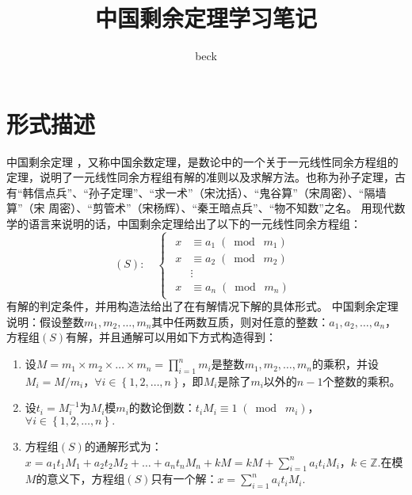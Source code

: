 \documentclass[UTF8]{ctexart}
\title{中国剩余定理学习笔记}
\author{beck}
\begin{document}
\maketitle
\vfill
\section*{形式描述}
中国剩余定理 \cite{中国剩余定理}，又称中国余数定理，是数论中的一个关于一元线性同余方程组的定理，说明了一元线性同余方程组有解的准则以及求解方法。也称为孙子定理，古有“韩信点兵”、“孙子定理”、“求一术”（宋沈括）、“鬼谷算”（宋周密）、“隔墙算”（宋 周密）、“剪管术”（宋杨辉）、“秦王暗点兵”、“物不知数”之名。
用现代数学的语言来说明的话，中国剩余定理给出了以下的一元线性同余方程组：
\[
    (S):\quad
    \begin{cases}
        \begin{aligned}
            x & \equiv a_1 \;(\bmod\;m_1) \\
            x & \equiv a_2 \;(\bmod\;m_2) \\
              & \vdots                    \\
            x & \equiv a_n \;(\bmod\;m_n)
        \end{aligned}
    \end{cases}
\]
有解的判定条件，并用构造法给出了在有解情况下解的具体形式。
中国剩余定理说明：假设整数$m_1,m_2,\ldots,m_n$其中任两数互质，则对任意的整数：$a_1,a_2,\ldots,a_n$，方程组$(S)$有解，并且通解可以用如下方式构造得到：
\begin{enumerate}[1.]
    \item 设$M = m_1 \times m_2 \times \ldots \times m_n = {\displaystyle \prod_{i=1}^n m_i}$是整数$m_1,m_2,\ldots,m_n$的乘积，并设$M_i=M/m_i$，$\forall i \in \left\{1,2,\ldots,n\right\}$，即$M_i$是除了$m_i$以外的$n - 1$个整数的乘积。
    \item 设$t_i = M_i^{-1}$为$M_i$模$m_i$的数论倒数：$t_iM_i \equiv 1\;(\bmod\;m_i)$，$\forall i \in \left\{1,2,\ldots,n\right\}.$
    \item 方程组$(S)$的通解形式为：$x = a_1t_1M_1 + a_2t_2M_2 + \ldots + a_nt_nM_n + kM = kM + {\displaystyle \sum_{i=1}^n a_it_iM_i}$，$k \in \mathbb{Z}.$在模$M$的意义下，方程组$(S)$只有一个解：$x = {\displaystyle \sum_{i=1}^n a_it_iM_i}.$
\end{enumerate}
\end{document}
